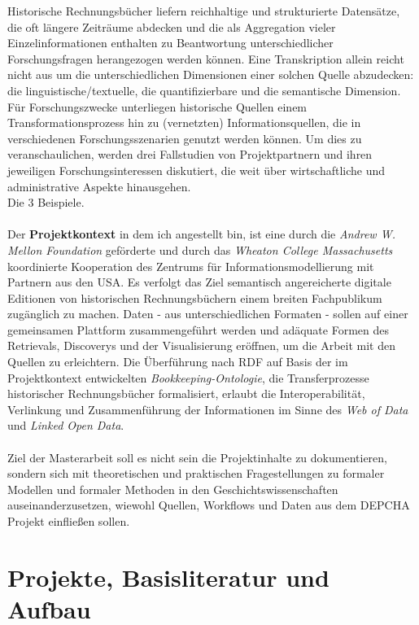 \documentclass[12pt,a4paper]{article}
\begin{document}
Historische Rechnungsbücher liefern reichhaltige und strukturierte Datensätze, die oft längere Zeiträume abdecken und die als Aggregation vieler Einzelinformationen enthalten zu Beantwortung unterschiedlicher Forschungsfragen herangezogen werden können. Eine Transkription allein reicht nicht aus um die unterschiedlichen Dimensionen einer solchen Quelle abzudecken: die linguistische/textuelle, die quantifizierbare und die semantische Dimension. Für Forschungszwecke unterliegen historische Quellen einem Transformationsprozess hin zu (vernetzten) Informationsquellen, die in verschiedenen Forschungsszenarien genutzt werden können. Um dies zu veranschaulichen, werden drei Fallstudien von Projektpartnern und ihren jeweiligen Forschungsinteressen diskutiert, die weit über wirtschaftliche und administrative Aspekte hinausgehen.
\\
Die 3 Beispiele.
\\
\\
Der \textbf{Projektkontext} in dem ich angestellt bin, ist eine durch die \textit{Andrew W. Mellon Foundation} geförderte und durch das \textit{Wheaton College Massachusetts} koordinierte Kooperation des Zentrums für Informationsmodellierung mit Partnern aus den USA. Es verfolgt das Ziel semantisch angereicherte digitale Editionen von historischen Rechnungsbüchern einem breiten Fachpublikum zugänglich zu machen. Daten - aus unterschiedlichen Formaten - sollen auf einer gemeinsamen Plattform zusammengeführt werden und adäquate Formen des Retrievals, Discoverys und der Visualisierung eröffnen, um die Arbeit mit den Quellen zu erleichtern. Die Überführung nach RDF auf Basis der im Projektkontext entwickelten \textit{Bookkeeping-Ontologie}, die Transferprozesse historischer Rechnungsbücher formalisiert, erlaubt die Interoperabilität, Verlinkung und Zusammenführung der Informationen im Sinne des \textit{Web of Data} und \textit{Linked Open Data}.
\\
\\
Ziel der Masterarbeit soll es nicht sein die Projektinhalte zu dokumentieren, sondern sich mit theoretischen und praktischen Fragestellungen zu formaler Modellen und formaler Methoden in den Geschichtswissenschaften  auseinanderzusetzen, wiewohl Quellen, Workflows und Daten aus dem DEPCHA Projekt einfließen sollen.

\section{Projekte, Basisliteratur und Aufbau}
\end{document}

